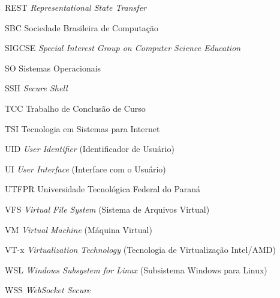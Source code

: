 \begin{siglas}
  \item[REST] \textit{Representational State Transfer}
  \item[SBC] Sociedade Brasileira de Computação
  \item[SIGCSE] \textit{Special Interest Group on Computer Science Education}
  \item[SO] Sistemas Operacionais
  \item[SSH] \textit{Secure Shell}
  \item[TCC] Trabalho de Conclusão de Curso
  \item[TSI] Tecnologia em Sistemas para Internet
  \item[UID] \textit{User Identifier} (Identificador de Usuário)
  \item[UI] \textit{User Interface} (Interface com o Usuário)
  \item[UTFPR] Universidade Tecnológica Federal do Paraná
  \item[VFS] \textit{Virtual File System} (Sistema de Arquivos Virtual)
  \item[VM] \textit{Virtual Machine} (Máquina Virtual)
  \item[VT-x] \textit{Virtualization Technology} (Tecnologia de Virtualização Intel/AMD)
  \item[WSL] \textit{Windows Subsystem for Linux} (Subsistema Windows para Linux)
  \item[WSS] \textit{WebSocket Secure}
\end{siglas}
